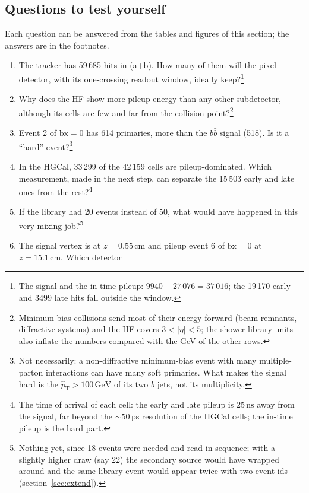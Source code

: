 \documentclass[11pt,a4paper]{article}
\newcommand{\bx}{\ensuremath{\mathrm{bx}}}
\newcommand{\bbbar}{\ensuremath{b\bar{b}}}
\newcommand{\GeV}{\,\mathrm{GeV}}
\newcommand{\ns}{\,\mathrm{ns}}
\newcommand{\cm}{\,\mathrm{cm}}
\newcommand{\ptHat}{\ensuremath{\hat{p}_{\mathrm{T}}}}
\begin{document}
\FloatBarrier
\subsection{Questions to test yourself}
\label{sec:questions}

Each question can be answered from the tables and figures of this section; the answers are in the footnotes.
\begin{enumerate}
\item The tracker has 59\,685 hits in (a+b). How many of them will the pixel detector, with its one-crossing
  readout window, ideally keep?\footnote{The signal and the in-time pileup: $9940 + 27\,076 = 37\,016$; the
  19\,170 early and 3499 late hits fall outside the window.}
\item Why does the HF show more pileup energy than any other subdetector, although its cells are few and
  far from the collision point?\footnote{Minimum-bias collisions send most of their energy forward (beam
  remnants, diffractive systems) and the HF covers $3<|\eta|<5$; the shower-library units also inflate the
  numbers compared with the GeV of the other rows.}
\item Event 2 of $\bx=0$ has 614 primaries, more than the \bbbar{} signal (518). Is it a ``hard'' event?\footnote{Not
  necessarily: a non-diffractive minimum-bias event with many multiple-parton interactions can have many soft
  primaries. What makes the signal hard is the $\ptHat>100\GeV$ of its two $b$ jets, not its multiplicity.}
\item In the HGCal, 33\,299 of the 42\,159 cells are pileup-dominated. Which measurement, made in the next step,
  can separate the 15\,503 early and late ones from the rest?\footnote{The time of arrival of each cell: the
  early and late pileup is $25\ns$ away from the signal, far beyond the $\sim50$\,ps resolution of the HGCal
  cells; the in-time pileup is the hard part.}
\item If the library had 20 events instead of 50, what would have happened in this very mixing job?\footnote{Nothing
  yet, since 18 events were needed and read in sequence; with a slightly higher draw (say 22) the secondary
  source would have wrapped around and the same library event would appear twice with two event ids
  (section~\ref{sec:extend}).}
\item The signal vertex is at $z=0.55\cm$ and pileup event 6 of $\bx=0$ at $z=15.1\cm$. Which detector

\end{enumerate}
\end{document}
